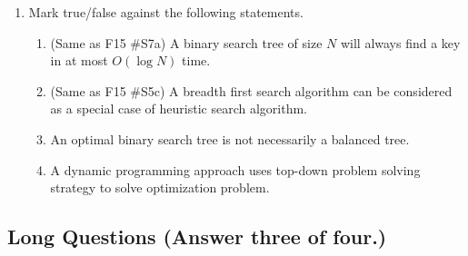 \begin{enumerate}
	\item Mark true/false against the following statements. 
	\begin{enumerate}
		\item (Same as F15 \#S7a) A binary search tree of size $N$ will always find a key in at most $O(\log N)$ time.
		\item (Same as F15 \#S5c) A breadth first search algorithm can be considered as a special case of heuristic search algorithm.
		\item An optimal binary search tree is not necessarily a balanced tree.
		\item A dynamic programming approach uses top-down problem solving strategy to solve optimization problem.
	\end{enumerate}

\end{enumerate}

\subsection{Long Questions (Answer three of four.)}

